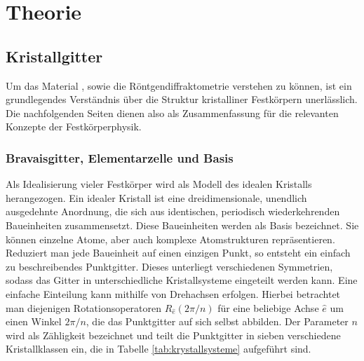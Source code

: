 \section{Theorie}\label{sec:theorie}

\subsection{Kristallgitter}\label{subsec:kristallgitter}
Um das Material \heo, sowie die Röntgendiffraktometrie verstehen zu können, ist ein grundlegendes Verständnis
über die Struktur kristalliner Festkörpern unerlässlich.
Die nachfolgenden Seiten dienen also als Zusammenfassung für die relevanten Konzepte der Festkörperphysik.

\subsubsection{Bravaisgitter, Elementarzelle und Basis}
Als Idealisierung vieler Festkörper wird als Modell des idealen Kristalls herangezogen.
Ein idealer Kristall ist eine dreidimensionale, unendlich ausgedehnte Anordnung, die sich aus identischen, periodisch
wiederkehrenden Baueinheiten zusammensetzt.
Diese Baueinheiten werden als Basis bezeichnet.
Sie können einzelne Atome, aber auch komplexe Atomstrukturen repräsentieren.
Reduziert man jede Baueinheit auf einen einzigen Punkt, so entsteht ein einfach zu beschreibendes Punktgitter.
\autocite[49]{Hunklinger}
Dieses unterliegt verschiedenen Symmetrien, sodass das Gitter in unterschiedliche Kristallsysteme eingeteilt werden
kann.
Eine einfache Einteilung kann mithilfe von Drehachsen erfolgen.
Hierbei betrachtet man diejenigen Rotationsoperatoren $R_{\hat{e}}(2\pi / n)$ für eine beliebige Achse $\hat{e}$ um
einen Winkel $2 \pi /n$, die das Punktgitter auf sich selbst abbilden.
Der Parameter $n$ wird als Zähligkeit bezeichnet und teilt die Punktgitter in sieben verschiedene Kristallklassen ein,
die in Tabelle \cref{tab:krystallsysteme} aufgeführt sind.
\autocite[53]{Hunklinger}
